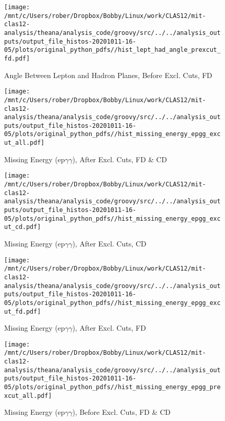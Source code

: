 \documentclass{article}
\begin{document}
\begin{landscape}
\begin{figure}[h]
        \texttt{[image: /mnt/c/Users/rober/Dropbox/Bobby/Linux/work/CLAS12/mit-clas12-analysis/theana/analysis\_code/groovy/src/../../analysis\_outputs/output\_file\_histos-20201011-16-05/plots/original\_python\_pdfs//hist\_lept\_had\_angle\_prexcut\_fd.pdf]}
        \captionsetup{textformat=empty,labelformat=blank}
        \caption{Angle Between Lepton and Hadron Planes, Before Excl. Cuts, FD}
    \end{figure}
    \clearpage
    
    \begin{figure}[h]
        \centering

        \texttt{[image: /mnt/c/Users/rober/Dropbox/Bobby/Linux/work/CLAS12/mit-clas12-analysis/theana/analysis\_code/groovy/src/../../analysis\_outputs/output\_file\_histos-20201011-16-05/plots/original\_python\_pdfs//hist\_missing\_energy\_epgg\_excut\_all.pdf]}
        \captionsetup{textformat=empty,labelformat=blank}
        \caption{Missing Energy (ep$\gamma$$\gamma$), After Excl. Cuts, FD \& CD}
    \end{figure}
    \clearpage
    
    \begin{figure}[h]
        \centering

        \texttt{[image: /mnt/c/Users/rober/Dropbox/Bobby/Linux/work/CLAS12/mit-clas12-analysis/theana/analysis\_code/groovy/src/../../analysis\_outputs/output\_file\_histos-20201011-16-05/plots/original\_python\_pdfs//hist\_missing\_energy\_epgg\_excut\_cd.pdf]}
        \captionsetup{textformat=empty,labelformat=blank}
        \caption{Missing Energy (ep$\gamma$$\gamma$), After Excl. Cuts, CD}
    \end{figure}
    \clearpage
    
    \begin{figure}[h]
        \centering

        \texttt{[image: /mnt/c/Users/rober/Dropbox/Bobby/Linux/work/CLAS12/mit-clas12-analysis/theana/analysis\_code/groovy/src/../../analysis\_outputs/output\_file\_histos-20201011-16-05/plots/original\_python\_pdfs//hist\_missing\_energy\_epgg\_excut\_fd.pdf]}
        \captionsetup{textformat=empty,labelformat=blank}
        \caption{Missing Energy (ep$\gamma$$\gamma$), After Excl. Cuts, FD}
    \end{figure}
    \clearpage
    
    \begin{figure}[h]
        \centering

        \texttt{[image: /mnt/c/Users/rober/Dropbox/Bobby/Linux/work/CLAS12/mit-clas12-analysis/theana/analysis\_code/groovy/src/../../analysis\_outputs/output\_file\_histos-20201011-16-05/plots/original\_python\_pdfs//hist\_missing\_energy\_epgg\_prexcut\_all.pdf]}
        \captionsetup{textformat=empty,labelformat=blank}
        \caption{Missing Energy (ep$\gamma$$\gamma$), Before Excl. Cuts, FD \& CD}
    \end{figure}
    \clearpage
    

\end{landscape}
\end{document}
